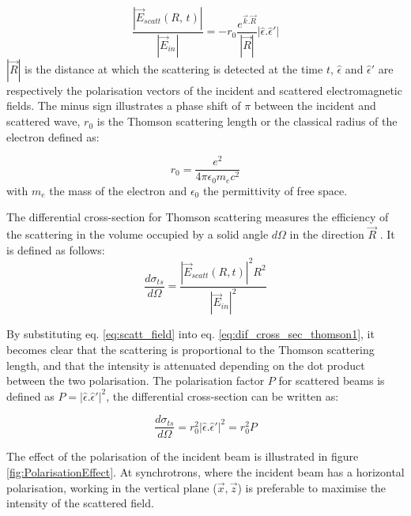 \begin{equation}
    \label{eq:scatt_field}
    \frac{|\vec{E}_{scatt}(R, \, t)|} {|\vec{E}_{in}|} = -r_0 \frac{e^{\vec{k}.\vec{R}}} {|\vec{R}|}| \hat{\epsilon}.\hat{\epsilon}'|
\end{equation}
$|\vec{R}|$ is the distance at which the scattering is detected at the time $t$, $\hat{\epsilon}$ and $\hat{\epsilon}'$ are respectively the polarisation vectors of the incident and scattered electromagnetic fields.
The minus sign illustrates a phase shift of $\pi$ between the incident and scattered wave, $r_0$ is the Thomson scattering length or the classical radius of the electron defined as:

\begin{equation}
    \label{eq:scatt_thomson_scat_length}
    r_0 = \frac{e^2} {4\pi\epsilon_0 m_e c^2}
\end{equation}
with $m_e$ the mass of the electron and $\epsilon_0$ the permittivity of free space.

The differential cross-section for Thomson scattering measures the efficiency of the scattering in the volume occupied by a solid angle $d\Omega$ in the direction $\vec{R}$ \parencite{NielsenMcMorrow}. It is defined as follows:
\begin{equation}
    \label{eq:dif_cross_sec_thomson1}
    \frac{d\sigma_{ts}} {d \Omega} = \frac{ |\vec{E}_{scatt}(R, t)|^2 R^2} {|\vec{E}_{in}|^2}
\end{equation}

By substituting eq. \ref{eq:scatt_field} into eq. \ref{eq:dif_cross_sec_thomson1}, it becomes clear that the scattering is proportional to the Thomson scattering length, and that the intensity is attenuated depending on the dot product between the two polarisation.
The polarisation factor $P$ for scattered beams is defined as $P =  | \hat{\epsilon}.\hat{\epsilon}'|^2$, the differential cross-section can be written as:

\begin{equation}
    \label{eq:dif_cross_sec_thomson2}
    \frac{d\sigma_{ts}} {d \Omega} = r_0^2 | \hat{\epsilon}.\hat{\epsilon}'|^2 = r_0^2 P
\end{equation}

The effect of the polarisation of the incident beam is illustrated in figure \ref{fig:PolarisationEffect}.
At synchrotrons, where the incident beam has a horizontal polarisation, working in the vertical plane ($\vec{x}, \vec{z}$) is preferable to maximise the intensity of the scattered field.

